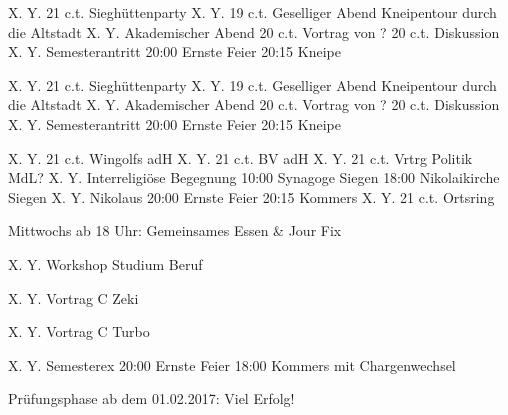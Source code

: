 %
% 

	
	\veranstaltungA
		{X. Y.} {21 c.t.} {}
		{Sieghüttenparty}
	\veranstaltungB
		{X. Y.} {19 c.t.} {}
		{Geselliger Abend} {Kneipentour durch die Altstadt}
	\veranstaltungC
		{X. Y.} {}
		{Akademischer Abend}
		{20 c.t.} {Vortrag von ?}
		{20 c.t.} {Diskussion}
	\veranstaltungC
		{X. Y.} {}
		{Semesterantritt}
		{20:00} {Ernste Feier}
		{20:15} {Kneipe}

		
	\veranstaltungA
		{X. Y.} {21 c.t.} {}
		{Sieghüttenparty}
	\veranstaltungB
		{X. Y.} {19 c.t.} {}
		{Geselliger Abend} {Kneipentour durch die Altstadt}
	\veranstaltungC
		{X. Y.} {}
		{Akademischer Abend}
		{20 c.t.} {Vortrag von ?}
		{20 c.t.} {Diskussion}
	\veranstaltungC
		{X. Y.} {}
		{Semesterantritt}
		{20:00} {Ernste Feier}
		{20:15} {Kneipe}
		
	\veranstaltungA
		{X. Y.} {21 c.t.} {}
		{Wingolfs adH}
	\veranstaltungA
		{X. Y.} {21 c.t.} {}
		{BV adH}
	\veranstaltungA
		{X. Y.} {21 c.t.} {}
		{Vrtrg Politik MdL?}
	\veranstaltungC
		{X. Y.} {}
		{Interreligiöse Begegnung}
		{10:00} {Synagoge Siegen}
		{18:00} {Nikolaikirche Siegen}
	\veranstaltungC
		{X. Y.} {}
		{Nikolaus}
		{20:00} {Ernste Feier}
		{20:15} {Kommers}
	\veranstaltungA
		{X. Y.} {21 c.t.} {}
		{Ortsring}
		
				
\neueAnkuendigung
		{Mittwochs ab 18 Uhr: Gemeinsames Essen \& Jour Fix}
		

	\veranstaltungA
		{X. Y.} {} {}
		{Workshop Studium Beruf}

	\veranstaltungA
		{X. Y.} {} {}
		{Vortrag C Zeki}

	\veranstaltungA
		{X. Y.} {} {}
		{Vortrag C Turbo}

	\veranstaltungC
		{X. Y.} {}
		{Semesterex}
		{20:00} {Ernste Feier}
		{18:00} {Kommers mit Chargenwechsel}

	\neueAnkuendigung
		{Prüfungsphase ab dem 01.02.2017: Viel Erfolg!}